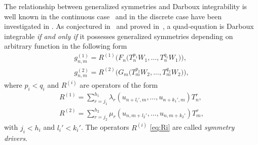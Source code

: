 \documentclass[pdftex]{sigma}
\numberwithin{equation}{section}
\begin{document}
The relationship between generalized symmetries and Darboux integrability is well known in the continuous case~\cite{ZhiberSokolov2011} and in the discrete case have been investigated in \cite{AdlerStartsev1999,Startsev2014,Startsev2016}. As conjectured in~\cite{GSL_Pavel} and proved in~\cite{Startsev2016},
a quad-equation is Darboux integrable \emph{if and only if}
it possesses generalized symmetries depending
on arbitrary function in the following form
\begin{subequations} \label{eq:gsymm}
 \begin{gather}
 g^{(1)}_{n,m} = R^{(1)}\big(F_{n}\big( T^{p_{1}}_{n}W_{1},\dots,T^{q_{1}}_{n}W_{1}\big)\big), \\
 g^{(2)}_{n,m} = R^{(2)} \big(G_{m}\big( T^{p_{2}}_{m}W_{2},\dots,T^{q_{2}}_{m}W_{2}\big)\big),
 \end{gather}
\end{subequations}
where $p_{i}<q_{i}$ and $R^{(i)}$ are operators of the form
\begin{subequations} \label{eq:Ri}
 \begin{gather}
 R^{(1)} = \sum_{r=j_{1}}^{h_{1}} \lambda_{r} ( u_{n+l_{i}',m},\dots,u_{n+k_{1}',m} )T_{n}^{r}, \label{eq:R1} \\
 R^{(2)} = \sum_{r=j_{2}}^{h_{2}} \mu_{r} ( u_{n,m+l_{2}'},\dots,u_{n,m+k_{2}'} )T_{m}^{r}, \label{eq:R2}
 \end{gather}
\end{subequations}
with $j_{i}<h_{i}$ and $l_{i}'<k_{i}'$. The operators $R^{(i)}$ \eqref{eq:Ri} are called \emph{symmetry drivers}.
\end{document}
